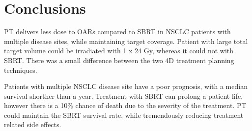 \section{Conclusions}

PT delivers less dose to OARs compared to SBRT in NSCLC patients with multiple disease sites, while maintaining target coverage. Patient with large total target volume 
could be irradiated with 1 x 24 Gy, whereas it could not with SBRT. 
There was a small difference between the two 4D treatment planning techniques.

Patients with multiple NSCLC disease site have a poor prognosis, with a median survival shorther than a year. 
Treatment with SBRT can prolong a patient life, however there is a 10\% chance of death due to the severity of the treatment. PT could
maintain the SBRT survival rate, while tremendously reducing treatment related side effects.